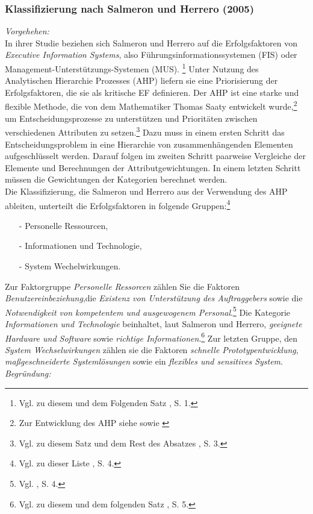\noindent
\subsubsection{Klassifizierung nach Salmeron und Herrero (2005)}
\textit{Vorgehehen:}\\\noindent
In ihrer Studie beziehen sich Salmeron und Herrero auf die Erfolgsfaktoren %
von \textit{Executive Information Systems}, also 
Führungsinformationssystemen (\acs{FIS}) oder Management-Unterstützungs-Systemen (\acs{MUS}).
\footnote{Vgl. zu diesem und dem Folgenden Satz \cite{Salmeron.2005}, S. 1.}
Unter Nutzung des Analytischen Hierarchie Prozesses (\acs{AHP}) liefern sie eine Priorisierung der Erfolgsfaktoren, die sie als kritische \ac{EF} definieren.
Der \ac{AHP} ist eine starke und flexible Methode, die von dem Mathematiker Thomas Saaty entwickelt wurde,\footnote{Zur Entwicklung des AHP siehe \cite{Saaty.1977} sowie \cite{Saaty.1980}} 
um Entscheidungsprozesse zu unterstützen und Prioritäten zwischen verschiedenen Attributen zu setzen.\footnote{Vgl. zu diesem Satz und dem Rest des Absatzes \cite{Salmeron.2005}, S. 3.}
Dazu muss in einem ersten Schritt das Entscheidungsproblem in eine Hierarchie von zusammenhängenden Elementen aufgeschlüsselt werden.
Darauf folgen im zweiten Schritt paarweise Vergleiche der Elemente und Berechnungen der Attributgewichtungen.
In einem letzten Schritt müssen die Gewichtungen der Kategorien berechnet werden.\\
Die Klassifizierung, die Salmeron und Herrero aus der Verwendung des \ac{AHP} ableiten, 
unterteilt die Erfolgsfaktoren in folgende Gruppen:\footnote{Vgl. zu dieser Liste \cite{Salmeron.2005}, S. 4.}
\begin{itemize}\itemsep0pt
\item[-]Personelle Ressourcen,
\item[-]Informationen und Technologie,
\item[-]System Wechelwirkungen.
\end{itemize}
\noindent
Zur Faktorgruppe \textit{Personelle Ressorcen} zählen Sie die Faktoren \textit{Benutzereinbeziehung},die \textit{Existenz von Unterstützung des Auftraggebers}
sowie die \textit{Notwendigkeit von kompetentem und ausgewogenem Personal}.\footnote{Vgl. \cite{Salmeron.2005}, S. 4.}
Die Kategorie \textit{Informationen und Technologie} beinhaltet, laut Salmeron und Herrero, \textit{geeignete Hardware und Software} sowie \textit{richtige Informationen}.\footnote{Vgl. zu diesem und dem folgenden Satz \cite{Salmeron.2005}, S. 5.}
Zur letzten Gruppe, den \textit{System Wechselwirkungen} zählen sie die Faktoren \textit{schnelle Prototypentwicklung}, \textit{maßgeschneiderte Systemlösungen} sowie ein \textit{flexibles und sensitives System}.
\\\noindent\textit{Begründung:}\\\noindent